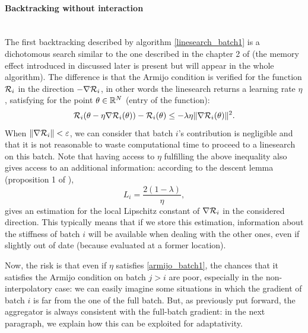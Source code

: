 \paragraph{Backtracking without interaction}
~~\\
The first backtracking described by algorithm \ref{linesearch_batch1} is a dichotomous search similar to the one described in the chapter 2 of \cite{Bilel_thesis} (the memory effect introduced in \cite{Rondepierre,Lyap_Theory_Bilel} discussed later is present but will appear in the whole algorithm). The difference is that the Armijo condition is verified for the function $\mathcal{R}_i$ in the direction $-\nabla \mathcal{R}_i$, in other words the linesearch returns a learning rate $\eta$, satisfying for the point $\theta \in \mathbb{R}^N$ (entry of the function):
\begin{equation}
	\mathcal{R}_i(\theta-\eta\nabla \mathcal{R}_i(\theta))-\mathcal{R}_i(\theta) \leq -\lambda \eta \|\nabla \mathcal{R}_i(\theta)\|^2.
	\label{armijo_batch1}
\end{equation}
When $\|\nabla \mathcal{R}_i\|<\varepsilon$, we can consider that batch $i$'s contribution is negligible and that it is not reasonable to waste computational time to proceed to a linesearch on this batch. 
Note that having access to $\eta$ fulfilling the above inequality also gives access to an additional information: according to the descent lemma (proposition 1 of \cite{Lyap_Theory_Bilel}), 
\begin{equation}
  \label{L_i}
  L_i=\frac{2(1-\lambda)}{\eta},
\end{equation}
gives an estimation for the local Lipschitz constant of $\nabla \mathcal{R}_i$ in the considered direction.
This typically means that if we store this estimation, information about the stiffness of
batch $i$ will be available when dealing with the other ones, even if slightly out of date (because evaluated at a former location).  


Now, the risk is that even if $\eta$ satisfies \eqref{armijo_batch1}, the chances that it satisfies the Armijo condition on batch $j>i$ are poor, especially in the non-interpolatory
case: we can easily imagine some situations in which the gradient of batch $i$ is far from the one of the full batch. 
But, as previously put forward, the aggregator is always consistent with the full-batch gradient: in the next paragraph, we explain how this can be exploited for adaptativity. 

